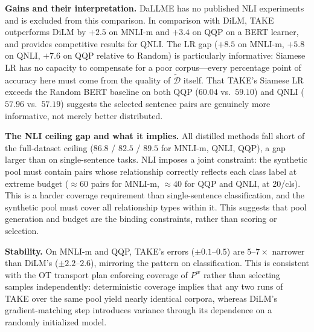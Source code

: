 \begin{foldable} %
  \textbf{Gains and their interpretation.}
  DaLLME has no published \ac{NLI} experiments and is excluded from this comparison.
  In comparison with DiLM, TAKE outperforms DiLM by $+2.5$ on MNLI-m and $+3.4$ on QQP on a BERT learner, and provides competitive results for QNLI.
  The LR gap ($+8.5$ on MNLI-m, $+5.8$ on QNLI, $+7.6$ on QQP relative to Random) is particularly informative: Siamese LR has no capacity to compensate for a poor corpus---every percentage point of accuracy here must come from the quality of $\tilde{\mathcal{D}}$ itself.
  That TAKE's Siamese LR exceeds the Random BERT baseline on both QQP ($60.04$ vs.\ $59.10$) and QNLI ($57.96$ vs.\ $57.19$) suggests the selected sentence pairs are genuinely more informative, not merely better distributed.
\end{foldable}

\begin{foldable} %
  \textbf{The \ac{NLI} ceiling gap and what it implies.}
  All distilled methods fall short of the full-dataset ceiling ($86.8$ / $82.5$ / $89.5$ for MNLI-m, QNLI, QQP), a gap larger than on single-sentence tasks.
  \ac{NLI} imposes a joint constraint: the synthetic pool must contain pairs whose relationship correctly reflects each class label at extreme budget ($\approx\!60$ pairs for MNLI-m, $\approx\!40$ for QQP and QNLI, at 20/cls).
  This is a harder coverage requirement than single-sentence classification, and the synthetic pool must cover all relationship types within it.
  This suggests that pool generation and budget are the binding constraints, rather than scoring or selection.
\end{foldable}

\begin{foldable} %
  \textbf{Stability.}
  On MNLI-m and QQP, TAKE's errors ($\pm0.1$--$0.5$) are $5$--$7\times$ narrower than DiLM's ($\pm2.2$--$2.6$), mirroring the pattern on classification.
  This is consistent with the \ac{OT} transport plan enforcing coverage of $P^w$ rather than selecting samples independently: deterministic coverage implies that any two runs of TAKE over the same pool yield nearly identical corpora, whereas DiLM's gradient-matching step introduces variance through its dependence on a randomly initialized model.
\end{foldable}

